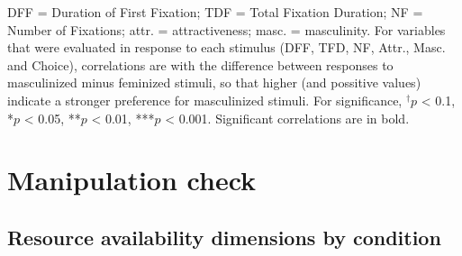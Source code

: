 \documentclass[
  bookmarksnumbered]{article}
\begin{document}
\begin{table}[H]
{\begin{threeparttable}
\begin{tablenotes}[para]
                            DFF = Duration of First Fixation; 
                            TDF = Total Fixation Duration; 
                            NF = Number of Fixations; 
                            attr. = attractiveness; 
                            masc. = masculinity. For variables that were evaluated in response to each stimulus 
                            (DFF, TFD, NF, Attr., Masc. and Choice), correlations are
                            with the difference between responses to masculinized minus 
                            feminized stimuli, so that higher (and possitive values) indicate 
                            a stronger preference for masculinized stimuli. For significance, $^{\dagger}p$ < 0.1, *$p$ < 0.05, **$p$ < 0.01, ***$p$ < 0.001. Significant correlations are in bold.
\end{tablenotes}
\end{threeparttable}}
\end{table}

\section{Manipulation check}\label{manipulation-check}

\subsection{Resource availability dimensions by condition}\label{resource-availability-dimensions-by-condition}
\end{document}
